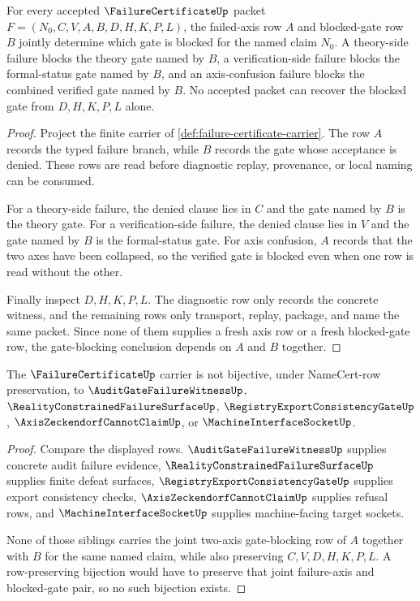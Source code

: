 \begin{theorem}
\label{thm:failure-certificate-gate-blocking}
For every accepted $\FailureCertificateUp$ packet $F=(N_0,C,V,A,B,D,H,K,P,L)$, the failed-axis row $A$ and blocked-gate row $B$ jointly determine which gate is blocked for the named claim $N_0$. A theory-side failure blocks the theory gate named by $B$, a verification-side failure blocks the formal-status gate named by $B$, and an axis-confusion failure blocks the combined verified gate named by $B$. No accepted packet can recover the blocked gate from $D,H,K,P,L$ alone.
\end{theorem}
\begin{proof}
Project the finite carrier of \autoref{def:failure-certificate-carrier}. The row $A$ records the typed failure branch, while $B$ records the gate whose acceptance is denied. These rows are read before diagnostic replay, provenance, or local naming can be consumed.

For a theory-side failure, the denied clause lies in $C$ and the gate named by $B$ is the theory gate. For a verification-side failure, the denied clause lies in $V$ and the gate named by $B$ is the formal-status gate. For axis confusion, $A$ records that the two axes have been collapsed, so the verified gate is blocked even when one row is read without the other.

Finally inspect $D,H,K,P,L$. The diagnostic row only records the concrete witness, and the remaining rows only transport, replay, package, and name the same packet. Since none of them supplies a fresh axis row or a fresh blocked-gate row, the gate-blocking conclusion depends on $A$ and $B$ together.
\end{proof}

\begin{theorem}
\label{thm:failure-certificate-axis-separation}
The $\FailureCertificateUp$ carrier is not bijective, under NameCert-row preservation, to $\AuditGateFailureWitnessUp$, $\RealityConstrainedFailureSurfaceUp$, $\RegistryExportConsistencyGateUp$, $\AxisZeckendorfCannotClaimUp$, or $\MachineInterfaceSocketUp$.
\end{theorem}
\begin{proof}
Compare the displayed rows. $\AuditGateFailureWitnessUp$ supplies concrete audit failure evidence, $\RealityConstrainedFailureSurfaceUp$ supplies finite defeat surfaces, $\RegistryExportConsistencyGateUp$ supplies export consistency checks, $\AxisZeckendorfCannotClaimUp$ supplies refusal rows, and $\MachineInterfaceSocketUp$ supplies machine-facing target sockets.

None of those siblings carries the joint two-axis gate-blocking row of $A$ together with $B$ for the same named claim, while also preserving $C,V,D,H,K,P,L$. A row-preserving bijection would have to preserve that joint failure-axis and blocked-gate pair, so no such bijection exists.
\end{proof}

